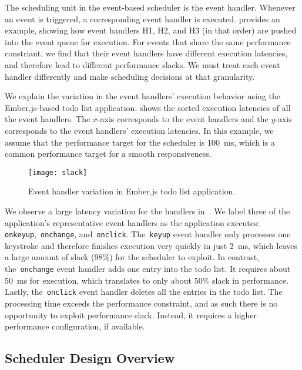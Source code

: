 The scheduling unit in the event-based scheduler is the event handler. Whenever an event is triggered, a corresponding event handler is executed.  provides an example, showing how event handlers H1, H2, and H3 (in that order) are pushed into the event queue for execution. For events that share the same performance constriant, we find that their event handlers have different execution latencies, and therefore lead to different performance slacks. We must treat each event handler differently and make scheduling decisions at that granularity.

We explain the variation in the event handlers' execution behavior using the Ember.js-based todo list application.  shows the sorted execution latencies of all the event handlers. The $x$-axis corresponds to the event handlers and the $y$-axis corresponds to the event handlers' execution latencies. In this example, we assume that the performance target for the scheduler is 100~ms, which is a common performance target for a smooth responsiveness.

\begin{figure}[t]
\centering
\texttt{[image: slack]}
\caption{Event handler variation in Ember.js todo list application.}
\label{fig:slack}
\end{figure}

We observe a large latency variation for the handlers in~. We label three of the application's representative event handlers as the application executes: \texttt{onkeyup},~\texttt{onchange}, and~\texttt{onclick}. The~\texttt{keyup} event handler only processes one keystroke and therefore finishes execution very quickly in just 2~ms, which leaves a large amount of slack (98\%) for the scheduler to exploit. In contrast, the~\texttt{onchange} event handler adds one entry into the todo list. It requires about 50~ms for execution, which translates to only about 50\% slack in performance. Lastly, the~\texttt{onclick} event handler deletes all the entries in the todo list. The processing time exceeds the performance constraint, and as such there is no opportunity to exploit performance slack. Instead, it requires a higher performance configuration, if available.

\subsection{Scheduler Design Overview}
\label{sec:runtime:ebs:overview}

